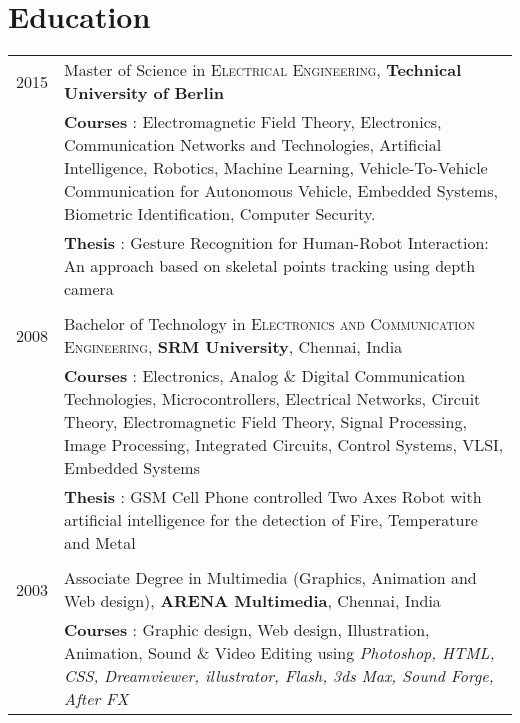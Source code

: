 \section{Education} 
\begin{longtable}
	{r|p{13cm}} 
	\textsc{2015} & Master of Science in \textsc{Electrical Engineering}, \textbf{Technical University of Berlin}\\
	&\footnotesize{\textbf{Courses} : Electromagnetic Field Theory, Electronics, Communication Networks and Technologies, Artificial Intelligence, Robotics, Machine Learning, Vehicle-To-Vehicle Communication for Autonomous Vehicle, Embedded Systems, Biometric Identification, Computer Security.}\\
	&\footnotesize{\textbf{Thesis} : Gesture Recognition for Human-Robot Interaction: An approach based on skeletal points tracking using depth camera }\\

	\multicolumn{2}{c}{} \\
	
	\textsc{2008} & Bachelor of Technology in \textsc{Electronics and Communication Engineering}, \textbf{SRM University}, Chennai, India\\
	&\footnotesize{\textbf{Courses} : Electronics, Analog \& Digital Communication Technologies, Microcontrollers, Electrical Networks, Circuit Theory, Electromagnetic Field Theory, Signal Processing, Image Processing, Integrated Circuits, Control Systems, VLSI, Embedded Systems}\\
	&\footnotesize{\textbf{Thesis} : GSM Cell Phone controlled Two Axes Robot with artificial intelligence for the detection of Fire, Temperature and Metal}\\
	
	\multicolumn{2}{c}{} \\
	
	\textsc{2003} & Associate Degree in Multimedia (Graphics, Animation and Web design), \textbf{ARENA Multimedia}, Chennai, India\\
	&\footnotesize{\textbf{Courses} : Graphic design, Web design, Illustration, Animation, Sound \& Video Editing using \emph{Photoshop, HTML, CSS, Dreamviewer, illustrator, Flash, 3ds Max, Sound Forge, After FX} }\\

\end{longtable}
